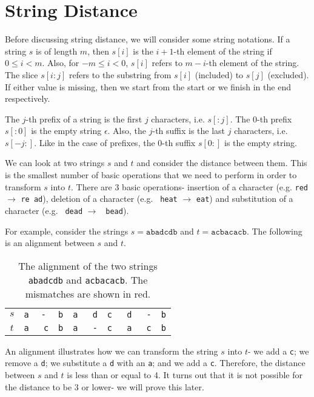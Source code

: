 \documentclass[a4paper, openany]{memoir}
\begin{document}
\section{String Distance}
Before discussing string distance, we will consider some string notations. If a string $s$ is of length $m$, then $s[i]$ is the $i+1$-th element of the string if $0 \leq i < m$. Also, for $-m \leq i < 0$, $s[i]$ refers to $m-i$-th element of the string. The slice $s[i:j]$ refers to the substring from $s[i]$ (included) to $s[j]$ (excluded). If either value is missing, then we start from the start or we finish in the end respectively.

The $j$-th prefix of a string is the first $j$ characters, i.e. $s[:j]$. The $0$-th prefix $s[:0]$ is the empty string $\epsilon$. Also, the $j$-th suffix is the last $j$ characters, i.e. $s[-j:]$. Like in the case of prefixes, the $0$-th suffix $s[0:]$ is the empty string.

We can look at two strings $s$ and $t$ and consider the distance between them. This is the smallest number of basic operations that we need to perform in order to transform $s$ into $t$. There are 3 basic operations- insertion of a character (e.g. \texttt{red} $\to$ \texttt{re{\color{red} a}d}), deletion of a character (e.g. \texttt{{\color{red} h}eat} $\to$ \texttt{eat}) and substitution of a character (e.g. \texttt{{\color{red} d}ead} $\to$ \texttt{{\color{red} b}ead}).

For example, consider the strings $s = \texttt{abadcdb}$ and $t = \texttt{acbacacb}$. The following is an alignment between $s$ and $t$.
\begin{table}[H]
    \centering
    \begin{tabular}{|c|ccccccccc|}
        \hline
        $s$ & \texttt{a} & \texttt{{\color{red}-}} &  \texttt{b} & \texttt{a} & \texttt{{\color{red} d}} & \texttt{c} & \texttt{{\color{red} d}} & \texttt{{\color{red} -}} & \texttt{b} \\
        $t$ & \texttt{a} & \texttt{{\color{red} c}} & \texttt{b} & \texttt{a} & \texttt{{\color{red} -}} & \texttt{c} & \texttt{{\color{red} a}} & \texttt{{\color{red} c}} & \texttt{b} \\
        \hline
    \end{tabular}
    \caption{The alignment of the two strings \texttt{abadcdb} and \texttt{acbacacb}. The mismatches are shown in red.}
\end{table}
\noindent An alignment illustrates how we can transform the string $s$ into $t$- we add a \texttt{c}; we remove a \texttt{d}; we substitute a \texttt{d} with an \texttt{a}; and we add a \texttt{c}. Therefore, the distance between $s$ and $t$ is less than or equal to 4. It turns out that it is not possible for the distance to be 3 or lower- we will prove this later.
\end{document}
